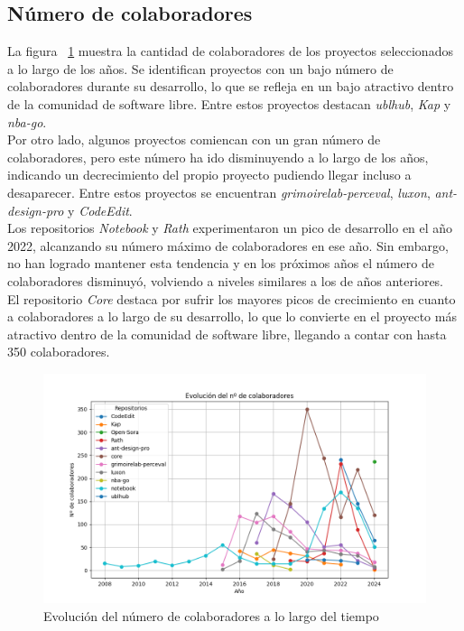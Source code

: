 \documentclass[a4paper, 12pt]{book}
\begin{document}
\subsection{Número de colaboradores}
\label{subsec:número-colaboradores}

La figura ~\ref{fig:grafica-colaboradores} muestra la cantidad de colaboradores de los proyectos seleccionados a lo largo de los años. Se identifican proyectos con un bajo número de colaboradores
durante su desarrollo, lo que se refleja en un bajo atractivo dentro de la comunidad de software libre. Entre estos proyectos destacan \textit{ublhub}, \textit{Kap} y \textit{nba-go}.
\\Por otro lado, algunos proyectos comiencan con un gran número de colaboradores, pero este número ha ido disminuyendo a lo largo de los años, indicando un decrecimiento del propio proyecto
pudiendo llegar incluso a desaparecer. Entre estos proyectos se encuentran \textit{grimoirelab-perceval}, \textit{luxon}, \textit{ant-design-pro} y \textit{CodeEdit}.
\\Los repositorios \textit{Notebook} y \textit{Rath} experimentaron un pico de desarrollo en el año 2022, alcanzando su número máximo de colaboradores en ese año. Sin embargo, no han logrado mantener
esta tendencia y en los próximos años el número de colaboradores disminuyó, volviendo a niveles similares a los de años anteriores.
\\El repositorio \textit{Core} destaca por sufrir los mayores picos de crecimiento en cuanto a colaboradores a lo largo de su desarrollo, lo que lo convierte en el proyecto más atractivo dentro de la
comunidad de software libre, llegando a contar con hasta 350 colaboradores.

\begin{figure}
  \centering
  \includegraphics[width=16cm, keepaspectratio]{img/contributors_graph.png}
  \caption{Evolución del número de colaboradores a lo largo del tiempo}
  \label{fig:grafica-colaboradores}
\end{figure}
\end{document}
